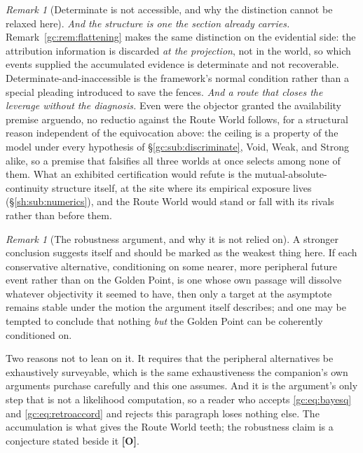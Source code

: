 \documentclass[11pt]{article}
\numberwithin{equation}{section}
\theoremstyle{plain}
\theoremstyle{definition}
\theoremstyle{remark}
\newtheorem{remark}[theorem]{Remark}
\begin{document}
\begin{remark}[Determinate is not accessible, and why the distinction
cannot be relaxed here]
\emph{And the structure is one the section already carries.}
Remark~\ref{gc:rem:flattening} makes the same distinction on the
evidential side: the attribution information is discarded \emph{at the
projection}, not in the world, so which events supplied the accumulated
evidence is determinate and not recoverable. Determinate-and-inaccessible
is the framework's normal condition rather than a special pleading
introduced to save the fences. \emph{And a route that closes the leverage without the diagnosis.}
Even were the objector granted the availability premise arguendo, no
reductio against the Route World follows, for a structural reason
independent of the equivocation above: the ceiling is a property of the
model under every hypothesis of \S\ref{gc:sub:discriminate}, Void,
Weak, and Strong alike, so a premise that falsifies all three worlds
at once selects among none of them. What an exhibited certification
would refute is the mutual-absolute-continuity structure itself, at the
site where its empirical exposure lives (\S\ref{sh:sub:numerics}), and
the Route World would stand or fall with its rivals rather than before
them.
\end{remark}

\begin{remark}[The robustness argument, and why it is not relied on]
\label{gc:rem:routerobust}
A stronger conclusion suggests itself and should be marked as the
weakest thing here. If each conservative alternative, conditioning on
some nearer, more peripheral future event rather than on the Golden
Point, is one whose own passage will dissolve whatever objectivity it
seemed to have, then only a target at the asymptote remains stable under
the motion the argument itself describes; and one may be tempted to
conclude that nothing \emph{but} the Golden Point can be coherently
conditioned on.

Two reasons not to lean on it. It requires that the peripheral
alternatives be exhaustively surveyable, which is the same
exhaustiveness the companion's own arguments purchase carefully and this
one assumes. And it is the argument's only step that is not a
likelihood computation, so a reader who accepts \eqref{gc:eq:bayesq} and
\eqref{gc:eq:retroaccord} and rejects this paragraph loses nothing else.
The accumulation is what gives the Route World teeth; the robustness
claim is a conjecture stated beside it \textbf{[O]}.
\end{remark}
\end{document}
